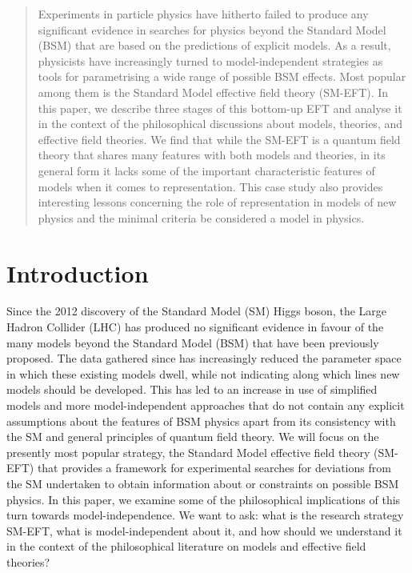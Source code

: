 
\begin{abstract}
Experiments in particle physics have hitherto failed to produce any significant evidence in
searches for physics beyond the Standard Model (BSM) that are based on the predictions of explicit models. 
As a result, physicists have increasingly turned to model-independent strategies as tools for parametrising a wide range of possible BSM effects. Most popular among them is the Standard Model effective field theory (SM-EFT). In this paper, we describe three stages of this bottom-up EFT and analyse it in the context of the philosophical discussions about models, theories, and effective field theories. We find that while the SM-EFT is a quantum field theory that shares many features with both models and theories, in its general form it lacks some of the important characteristic features of models when it comes to representation. This case study also provides interesting lessons concerning the role of representation in models of new physics and the minimal criteria be considered a model in physics.
\end{abstract}

\section{Introduction}

Since the 2012 discovery of the Standard Model (SM) Higgs boson, the Large Hadron Collider (LHC) has produced no significant evidence in favour of the many models beyond the Standard Model (BSM) that have been previously proposed. 
The data gathered since has increasingly reduced the parameter space in which these existing models dwell, while not indicating along which lines new models should be developed.
This has led to an increase in use of simplified models and more model-independent approaches that do not contain any explicit assumptions about the features of BSM physics apart from its consistency with the SM and general principles of quantum field theory. 
We will focus on the presently most popular strategy, the Standard Model effective field theory (SM-EFT) that provides a framework for experimental searches for deviations from the SM undertaken to obtain information about or constraints on possible BSM physics.
In this paper, we examine some of the philosophical implications of this turn towards model-independence.
We want to ask: what is the research strategy SM-EFT, what is model-independent about it, and how should we understand it in the context of the philosophical literature on models and effective field theories?

